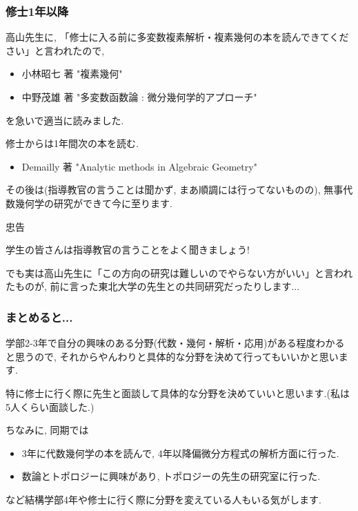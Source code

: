 \documentclass[11pt,dvipdfmx]{beamer}
\theoremstyle{definition}
\theoremstyle{remark}
\begin{document}
\begin{frame} 
 \frametitle{修士1年以降}
高山先生に, 「修士に入る前に多変数複素解析・複素幾何の本を読んできてください」と言われたので, 
\begin{itemize}
 \item 小林昭七 著 "複素幾何"
 \item 中野茂雄 著 "多変数函数論 : 微分幾何学的アプローチ"
 \end{itemize}
 を急いで適当に読みました.
 
 \vspace{11pt}
 修士からは1年間次の本を読む. 
 \begin{itemize}
 \item Demailly 著 "Analytic methods in Algebraic Geometry"
 \end{itemize} 
 
 その後は(指導教官の言うことは聞かず, まあ順調には行ってないものの), 無事代数幾何学の研究ができて今に至ります. 
 
  \pause
 \begin{block}{忠告}
 \begin{center}%
学生の皆さんは指導教官の言うことをよく聞きましょう!
 \end{center}
  \end{block}

 {\scriptsize
でも実は高山先生に「この方向の研究は難しいのでやらない方がいい」と言われたものが, 前に言った東北大学の先生との共同研究だったりします...
}


  
\end{frame}



\begin{frame} 
 \frametitle{まとめると...}
 
 \begin{block}{}
  \begin{center}
学部2-3年で自分の興味のある分野(代数・幾何・解析・応用)がある程度わかると思うので, それからやんわりと具体的な分野を決めて行ってもいいかと思います. 
 \end{center}
 \end{block}
 
特に修士に行く際に先生と面談して具体的な分野を決めていいと思います.(私は5人くらい面談した.)
 
 \pause
 \vspace{11pt}
 ちなみに, 同期では
 \begin{itemize}
 \item 3年に代数幾何学の本を読んで, 4年以降偏微分方程式の解析方面に行った.
 \item 数論とトポロジーに興味があり, トポロジーの先生の研究室に行った.
 \end{itemize}
など結構学部4年や修士に行く際に分野を変えている人もいる気がします.
　
\end{frame}
\end{document}
